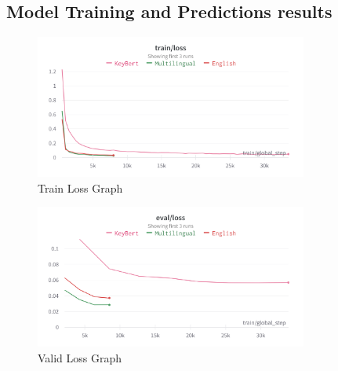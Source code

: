 \subsection{Model Training and Predictions results}
\begin{figure}[h]
    \centering
    \includegraphics[width=0.80\textwidth,height=0.35\textwidth]{Figures/TrainLoss.png}
    \caption{\label{fig:myfig1}Train Loss Graph}
\end{figure}
\begin{figure}[h]
    \centering
    \includegraphics[width=0.80\textwidth,height=0.35\textwidth]{Figures/ValidLoss.png}
    \caption{\label{fig:myfig2}Valid Loss Graph}
\end{figure}

